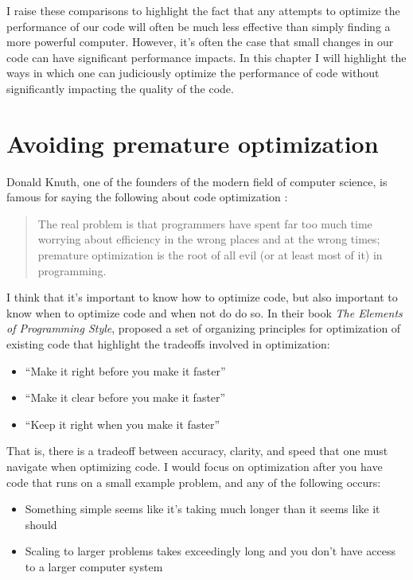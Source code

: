 I raise these comparisons to highlight the fact that any attempts to optimize the performance of our code will often be much less effective than simply finding a more powerful computer.  However, it's often the case that small changes in our code can have significant performance impacts. In this chapter I will highlight the ways in which one can judiciously optimize the performance of code without significantly impacting the quality of the code.

\section{Avoiding premature optimization}

Donald Knuth, one of the founders of the modern field of computer science, is famous for saying the following about code optimization \citep{Knuth:1974aa}:

\begin{quote}
The real problem is that programmers have spent far too much time worrying about efficiency in the wrong places and at the wrong times; premature optimization is the root of all evil (or at least most of it) in programming.
\end{quote}

I think that it's important to know how to optimize code, but also important to know when to optimize code and when not do do so.  In their book \textit{The Elements of Programming Style}, \citet{Kernighan:1978aa} proposed a set of organizing principles for optimization of existing code that  highlight the tradeoffs involved in optimization:

\begin{itemize}
\item ``Make it right before you make it faster''
\item ``Make it clear before you make it faster''
\item ``Keep it right when you make it faster''
\end{itemize}

That is, there is a tradeoff between accuracy, clarity, and speed that one must navigate when optimizing code.  I would focus on optimization after you have code that runs on a small example problem, and any of the following occurs:

\begin{itemize}
\item Something simple seems like it's taking much longer than it seems like it should
\item Scaling to larger problems takes exceedingly long and you don't have access to a larger computer system
\end{itemize}

